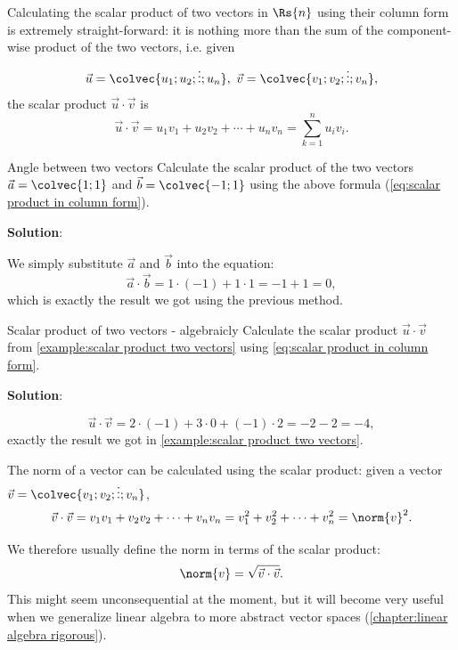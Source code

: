 Calculating the scalar product of two vectors in $\Rs{n}$ using their column form is extremely straight-forward: it is nothing more than the sum of the component-wise product of the two vectors, i.e. given
\[
	\vec{u}=\colvec{u_{1};u_{2};\vdots;u_{n}},\ \vec{v}=\colvec{v_{1};v_{2};\vdots;v_{n}},
\]
the scalar product $\vec{u}\cdot\vec{v}$ is
\begin{equation}
	\vec{u}\cdot\vec{v} = u_{1}v_{1} + u_{2}v_{2} + \cdots + u_{n}v_{n} = \sum\limits_{k=1}^{n}u_{i}v_{i}.
	\label{eq:scalar product in column form}
\end{equation}

\begin{example}{Angle between two vectors}{}
	Calculate the scalar product of the two vectors $\vec{a}=\colvec{1;1}$ and $\vec{b}=\colvec{-1;1}$ using the above formula (\autoref{eq:scalar product in column form}).

	\vspace{1em}
	\textbf{Solution}:
	
	We simply substitute $\vec{a}$ and $\vec{b}$ into the equation:
	\[
		\vec{a}\cdot\vec{b} = 1\cdot(-1) + 1\cdot1 = -1+1 = 0,
	\]
	which is exactly the result we got using the previous method.
\end{example}

\begin{example}{Scalar product of two vectors - algebraicly}{}
	Calculate the scalar product $\vec{u}\cdot\vec{v}$ from \autoref{example:scalar product two vectors} using \autoref{eq:scalar product in column form}.

	\vspace{1em}
	\textbf{Solution}:

	\[
		\vec{u}\cdot\vec{v} = 2\cdot(-1) + 3\cdot0 + (-1)\cdot2 = -2-2 = -4,
	\]
	exactly the result we got in \autoref{example:scalar product two vectors}.
\end{example}
The norm of a vector can be calculated using the scalar product: given a vector $\vec{v}=\colvec{v_{1};v_{2};\vdots;v_{n}}$,
\begin{equation}
	\vec{v}\cdot\vec{v} = v_{1}v_{1} + v_{2}v_{2} + \cdots + v_{n}v_{n} = v_{1}^{2} + v_{2}^{2} + \cdots + v_{n}^{2} = \norm{v}^{2}.
	\label{eq:scalar product to norm}
\end{equation}

We therefore usually define the norm in terms of the scalar product:
\begin{equation}
	\norm{v} = \sqrt{\vec{v}\cdot\vec{v}}.
	\label{eq:norm from scalar product}
\end{equation}
This might seem unconsequential at the moment, but it will become very useful when we generalize linear algebra to more abstract vector spaces (\autoref{chapter:linear algebra rigorous}).

